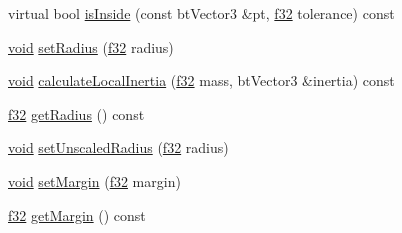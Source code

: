 \begin{DoxyCompactItemize}
\item 
virtual bool \mbox{\hyperlink{classnjli_1_1_physics_shape_sphere_a10b233e9fc9b6dc6ac593fed898b472b}{is\+Inside}} (const bt\+Vector3 \&pt, \mbox{\hyperlink{_util_8h_a5f6906312a689f27d70e9d086649d3fd}{f32}} tolerance) const
\item 
\mbox{\hyperlink{_thread_8h_af1e856da2e658414cb2456cb6f7ebc66}{void}} \mbox{\hyperlink{classnjli_1_1_physics_shape_sphere_ae014734c779ae780a981142cf8ae7f9d}{set\+Radius}} (\mbox{\hyperlink{_util_8h_a5f6906312a689f27d70e9d086649d3fd}{f32}} radius)
\item 
\mbox{\hyperlink{_thread_8h_af1e856da2e658414cb2456cb6f7ebc66}{void}} \mbox{\hyperlink{classnjli_1_1_physics_shape_sphere_a6e3ad5cd99a9fa760cd937aab23f9c35}{calculate\+Local\+Inertia}} (\mbox{\hyperlink{_util_8h_a5f6906312a689f27d70e9d086649d3fd}{f32}} mass, bt\+Vector3 \&inertia) const
\item 
\mbox{\hyperlink{_util_8h_a5f6906312a689f27d70e9d086649d3fd}{f32}} \mbox{\hyperlink{classnjli_1_1_physics_shape_sphere_a639cf12522dc348269c156f6dea675ee}{get\+Radius}} () const
\item 
\mbox{\hyperlink{_thread_8h_af1e856da2e658414cb2456cb6f7ebc66}{void}} \mbox{\hyperlink{classnjli_1_1_physics_shape_sphere_af38100684789bb68150f2b8ffb8389ff}{set\+Unscaled\+Radius}} (\mbox{\hyperlink{_util_8h_a5f6906312a689f27d70e9d086649d3fd}{f32}} radius)
\item 
\mbox{\hyperlink{_thread_8h_af1e856da2e658414cb2456cb6f7ebc66}{void}} \mbox{\hyperlink{classnjli_1_1_physics_shape_sphere_a0e111b3b9189d7851bce31d92405244b}{set\+Margin}} (\mbox{\hyperlink{_util_8h_a5f6906312a689f27d70e9d086649d3fd}{f32}} margin)
\item 
\mbox{\hyperlink{_util_8h_a5f6906312a689f27d70e9d086649d3fd}{f32}} \mbox{\hyperlink{classnjli_1_1_physics_shape_sphere_a36ac0f56c02d29825febf9261cd8fa1b}{get\+Margin}} () const
\end{DoxyCompactItemize}
